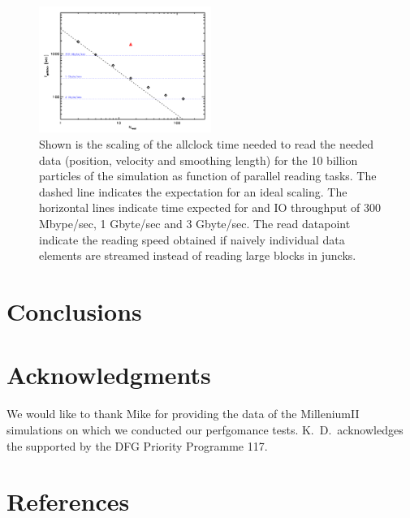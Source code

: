 \begin{figure}
\begin{center}
\includegraphics[width=0.5\textwidth]{t_read.pdf}
\end{center}
\caption{Shown is the scaling of the allclock time needed to read the needed data 
(position, velocity and smoothing length) for the 10 billion particles of the simulation
as function of parallel reading tasks. The dashed line indicates the expectation for an 
ideal scaling. The horizontal lines indicate time expected for and IO throughput of 300 Mbype/sec,
1 Gbyte/sec and 3 Gbyte/sec. The read datapoint indicate the reading speed obtained if naively 
individual data elements are streamed instead of reading large blocks in juncks.}\label{read_scaling}
\end{figure}


\section{Conclusions}
\label{conclusions}

\section*{Acknowledgments}
We would like to thank Mike for providing the data of the MilleniumII simulations 
on which we conducted our perfgomance tests. K.~D.~acknowledges the
supported by the DFG Priority Programme 117.

\section*{References}



